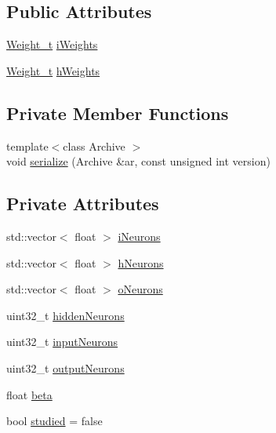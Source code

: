 \subsection*{Public Attributes}
\begin{DoxyCompactItemize}
\item 
\hyperlink{_soil_math_types_8h_ac56ad2b88186620fd0de0d213aa715dd}{Weight\+\_\+t} \hyperlink{class_soil_math_1_1_n_n_a96b0fe3caeed3d285204a6b4506075c9}{i\+Weights}
\item 
\hyperlink{_soil_math_types_8h_ac56ad2b88186620fd0de0d213aa715dd}{Weight\+\_\+t} \hyperlink{class_soil_math_1_1_n_n_a46db1b2814215509a7345fccc8928efe}{h\+Weights}
\end{DoxyCompactItemize}
\subsection*{Private Member Functions}
\begin{DoxyCompactItemize}
\item 
{\footnotesize template$<$class Archive $>$ }\\void \hyperlink{class_soil_math_1_1_n_n_a110f1834e96d352572fcf5124e1a26b0}{serialize} (Archive \&ar, const unsigned int version)
\end{DoxyCompactItemize}
\subsection*{Private Attributes}
\begin{DoxyCompactItemize}
\item 
std\+::vector$<$ float $>$ \hyperlink{class_soil_math_1_1_n_n_aa5a6a6014722338fb8af2f79d6187998}{i\+Neurons}
\item 
std\+::vector$<$ float $>$ \hyperlink{class_soil_math_1_1_n_n_a459bde01ce33e0b27803cbe4a3b114b4}{h\+Neurons}
\item 
std\+::vector$<$ float $>$ \hyperlink{class_soil_math_1_1_n_n_a50a52b41982f6845dc5294f17607774b}{o\+Neurons}
\item 
uint32\+\_\+t \hyperlink{class_soil_math_1_1_n_n_aedf4b2ddaae281d83e666c308e5d67c4}{hidden\+Neurons}
\item 
uint32\+\_\+t \hyperlink{class_soil_math_1_1_n_n_a51723ae01e9b0a95c9aa6ac4f4c569fc}{input\+Neurons}
\item 
uint32\+\_\+t \hyperlink{class_soil_math_1_1_n_n_a65ce6c65168fbe7051c25dccf4bf2b0c}{output\+Neurons}
\item 
float \hyperlink{class_soil_math_1_1_n_n_a4bb773955d78fa6f064b39a9149b78c8}{beta}
\item 
bool \hyperlink{class_soil_math_1_1_n_n_aed36297c9221a837fee94f4774b614bf}{studied} = false
\end{DoxyCompactItemize}
